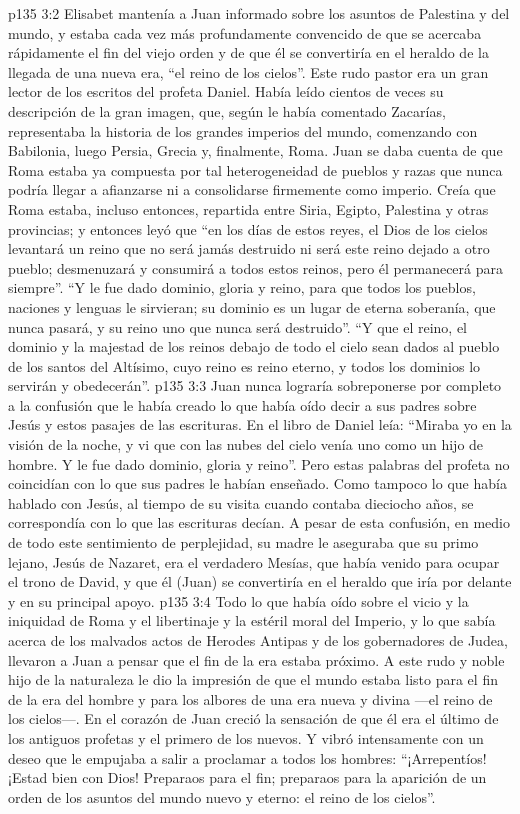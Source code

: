 \vs p135 3:2 \pc Elisabet mantenía a Juan informado sobre los asuntos de Palestina y del mundo, y estaba cada vez más profundamente convencido de que se acercaba rápidamente el fin del viejo orden y de que él se convertiría en el heraldo de la llegada de una nueva era, “el reino de los cielos”. Este rudo pastor era un gran lector de los escritos del profeta Daniel. Había leído cientos de veces su descripción de la gran imagen, que, según le había comentado Zacarías, representaba la historia de los grandes imperios del mundo, comenzando con Babilonia, luego Persia, Grecia y, finalmente, Roma. Juan se daba cuenta de que Roma estaba ya compuesta por tal heterogeneidad de pueblos y razas que nunca podría llegar a afianzarse ni a consolidarse firmemente como imperio. Creía que Roma estaba, incluso entonces, repartida entre Siria, Egipto, Palestina y otras provincias; y entonces leyó que “en los días de estos reyes, el Dios de los cielos levantará un reino que no será jamás destruido ni será este reino dejado a otro pueblo; desmenuzará y consumirá a todos estos reinos, pero él permanecerá para siempre”. “Y le fue dado dominio, gloria y reino, para que todos los pueblos, naciones y lenguas le sirvieran; su dominio es un lugar de eterna soberanía, que nunca pasará, y su reino uno que nunca será destruido”. “Y que el reino, el dominio y la majestad de los reinos debajo de todo el cielo sean dados al pueblo de los santos del Altísimo, cuyo reino es reino eterno, y todos los dominios lo servirán y obedecerán”.
\vs p135 3:3 \pc Juan nunca lograría sobreponerse por completo a la confusión que le había creado lo que había oído decir a sus padres sobre Jesús y estos pasajes de las escrituras. En el libro de Daniel leía: “Miraba yo en la visión de la noche, y vi que con las nubes del cielo venía uno como un hijo de hombre. Y le fue dado dominio, gloria y reino”. Pero estas palabras del profeta no coincidían con lo que sus padres le habían enseñado. Como tampoco lo que había hablado con Jesús, al tiempo de su visita cuando contaba dieciocho años, se correspondía con lo que las escrituras decían. A pesar de esta confusión, en medio de todo este sentimiento de perplejidad, su madre le aseguraba que su primo lejano, Jesús de Nazaret, era el verdadero Mesías, que había venido para ocupar el trono de David, y que él (Juan) se convertiría en el heraldo que iría por delante y en su principal apoyo.
\vs p135 3:4 Todo lo que había oído sobre el vicio y la iniquidad de Roma y el libertinaje y la estéril moral del Imperio, y lo que sabía acerca de los malvados actos de Herodes Antipas y de los gobernadores de Judea, llevaron a Juan a pensar que el fin de la era estaba próximo. A este rudo y noble hijo de la naturaleza le dio la impresión de que el mundo estaba listo para el fin de la era del hombre y para los albores de una era nueva y divina ---el reino de los cielos---. En el corazón de Juan creció la sensación de que él era el último de los antiguos profetas y el primero de los nuevos. Y vibró intensamente con un deseo que le empujaba a salir a proclamar a todos los hombres: “¡Arrepentíos! ¡Estad bien con Dios! Preparaos para el fin; preparaos para la aparición de un orden de los asuntos del mundo nuevo y eterno: el reino de los cielos”.
